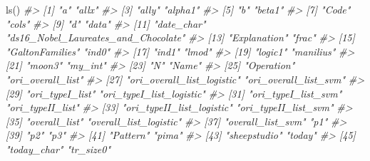 \documentclass[
]{book}
\newenvironment{Shaded}{\begin{snugshade}}{\end{snugshade}}
\newcommand{\CommentTok}[1]{\textcolor[rgb]{0.56,0.35,0.01}{\textit{#1}}}
\newcommand{\FunctionTok}[1]{\textcolor[rgb]{0.00,0.00,0.00}{#1}}
\newcommand{\NormalTok}[1]{#1}
\begin{document}
\begin{Shaded}
\begin{Highlighting}[]
\FunctionTok{ls}\NormalTok{()}
\CommentTok{\#\textgreater{}  [1] "a"                                  "allx"                              }
\CommentTok{\#\textgreater{}  [3] "ally"                               "alpha1"                            }
\CommentTok{\#\textgreater{}  [5] "b"                                  "beta1"                             }
\CommentTok{\#\textgreater{}  [7] "Code"                               "cols"                              }
\CommentTok{\#\textgreater{}  [9] "d"                                  "data"                              }
\CommentTok{\#\textgreater{} [11] "date\_char"                          "ds16\_Nobel\_Laureates\_and\_Chocolate"}
\CommentTok{\#\textgreater{} [13] "Explanation"                        "frac"                              }
\CommentTok{\#\textgreater{} [15] "GaltonFamilies"                     "ind0"                              }
\CommentTok{\#\textgreater{} [17] "ind1"                               "lmod"                              }
\CommentTok{\#\textgreater{} [19] "logic1"                             "manilius"                          }
\CommentTok{\#\textgreater{} [21] "moon3"                              "my\_int"                            }
\CommentTok{\#\textgreater{} [23] "N"                                  "Name"                              }
\CommentTok{\#\textgreater{} [25] "Operation"                          "ori\_overall\_list"                  }
\CommentTok{\#\textgreater{} [27] "ori\_overall\_list\_logistic"          "ori\_overall\_list\_svm"              }
\CommentTok{\#\textgreater{} [29] "ori\_typeI\_list"                     "ori\_typeI\_list\_logistic"           }
\CommentTok{\#\textgreater{} [31] "ori\_typeI\_list\_svm"                 "ori\_typeII\_list"                   }
\CommentTok{\#\textgreater{} [33] "ori\_typeII\_list\_logistic"           "ori\_typeII\_list\_svm"               }
\CommentTok{\#\textgreater{} [35] "overall\_list"                       "overall\_list\_logistic"             }
\CommentTok{\#\textgreater{} [37] "overall\_list\_svm"                   "p1"                                }
\CommentTok{\#\textgreater{} [39] "p2"                                 "p3"                                }
\CommentTok{\#\textgreater{} [41] "Pattern"                            "pima"                              }
\CommentTok{\#\textgreater{} [43] "sheepstudio"                        "today"                             }
\CommentTok{\#\textgreater{} [45] "today\_char"                         "tr\_size0"                          }

\end{Highlighting}
\end{Shaded}
\end{document}
